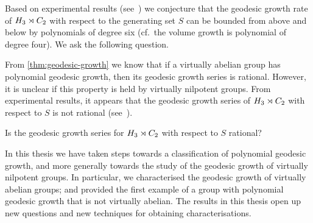 Based on experimental results (see~\cite{githubcode}) we conjecture that the geodesic growth rate of $H_3 \rtimes C_2$ with respect to the generating set $S$ can be bounded from above and below by polynomials of degree six (cf.~the volume growth is polynomial of degree four).
We ask the following question.

From \cref{thm:geodesic-growth} we know that if a virtually abelian group has polynomial geodesic growth, then its geodesic growth series is rational.
However, it is unclear if this property is held by virtually nilpotent groups.
From experimental results, it appears that the geodesic growth series of $H_3 \rtimes C_2$ with respect to $S$ is not rational (see~\cite{githubcode}).

\begin{question}
	Is the geodesic growth series for $H_3 \rtimes C_2$ with respect to $S$ rational?
\end{question}

In this thesis we have taken steps towards a classification of polynomial geodesic growth, and more generally towards the study of the geodesic growth of virtually nilpotent groups.
In particular, we characterised the geodesic growth of virtually abelian groups; and provided the first example of a group with polynomial geodesic growth that is not virtually abelian.
The results in this thesis open up new questions and new techniques for obtaining characterisations.